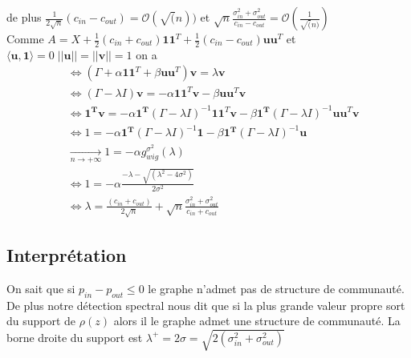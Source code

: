 de plus $\frac{1}{2\sqrt{n}}(c_{in} - c_{out}) = \mathcal{O}(\sqrt(n))$ et $\sqrt{n}\frac{\sigma_{in}^2 + \sigma_{out}^2}{c_{in} - c_{out}} =  \mathcal{O}(\frac{1}{\sqrt(n)})$\\
 
Comme $A = X + \frac{1}{2}(c_{in} + c_{out})\mathbf{11}^T + \frac{1}{2}(c_{in} - c_{out})\mathbf{uu}^T$ et $\langle\mathbf{u}, \mathbf{1}\rangle = 0 \; ||\mathbf{u}||=||\mathbf{v}||=1$ on a
\begin{align*}
	&\Leftrightarrow (\Gamma + \alpha\mathbf{11}^T + \beta \mathbf{uu}^T)\mathbf{v} = \lambda \mathbf{v}\\
	&\Leftrightarrow (\Gamma - \lambda I)\mathbf{v} = -\alpha\mathbf{11}^T\mathbf{v} - \beta \mathbf{uu}^T\mathbf{v} \\
	&\Leftrightarrow \mathbf{1^Tv} = -\alpha\mathbf{1^T} (\Gamma - \lambda I)^{-1}\mathbf{11}^T\mathbf{v} - \beta \mathbf{1^T} (\Gamma - \lambda I)^{-1}\mathbf{uu}^T\mathbf{v} \\
	&\Leftrightarrow 1 = -\alpha\mathbf{1^T} (\Gamma - \lambda I)^{-1}\mathbf{1} - \beta \mathbf{1^T} (\Gamma - \lambda I)^{-1}\mathbf{u} \\
	&\xrightarrow[n \to +\infty]{} 1 = -\alpha g_{wig}^{\sigma^2}(\lambda) \\
	&\Leftrightarrow 1 = -\alpha  \frac{- \lambda - \sqrt{(\lambda^2 - 4\sigma^2)}}{2\sigma^2}\\
	&\Leftrightarrow \lambda = \frac{(c_{in} + c_{out})}{2\sqrt{n}} + \sqrt{n}\frac{\sigma_{in}^2 + \sigma_{out}^2}{c_{in} + c_{out}}
\end{align*} 

\subsection{Interprétation}
On sait que si $p_{in} - p_{out} \le 0$  le graphe n'admet pas de structure de communauté.
De plus notre détection spectral nous dit que si la plus grande valeur propre sort du support de $\rho(z)$ alors il le graphe admet une structure de communauté.
La borne droite du support est $\lambda^+ = 2\sigma = \sqrt{2(\sigma_{in}^2 + \sigma_{out}^2)}$ 